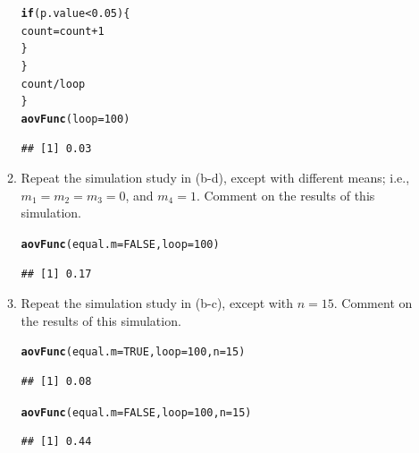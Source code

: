\documentclass{article}\usepackage[]{graphicx}\usepackage[]{color}
\makeatletter
\newcommand{\hlnum}[1]{\textcolor[rgb]{0.686,0.059,0.569}{#1}}%
\newcommand{\hlopt}[1]{\textcolor[rgb]{0,0,0}{#1}}%
\newcommand{\hlstd}[1]{\textcolor[rgb]{0.345,0.345,0.345}{#1}}%
\newcommand{\hlkwa}[1]{\textcolor[rgb]{0.161,0.373,0.58}{\textbf{#1}}}%
\newcommand{\hlkwb}[1]{\textcolor[rgb]{0.69,0.353,0.396}{#1}}%
\newcommand{\hlkwc}[1]{\textcolor[rgb]{0.333,0.667,0.333}{#1}}%
\newcommand{\hlkwd}[1]{\textcolor[rgb]{0.737,0.353,0.396}{\textbf{#1}}}%
\newenvironment{kframe}{%
 \def\at@end@of@kframe{}%
 \ifinner\ifhmode%
  \def\at@end@of@kframe{\end{minipage}}%
  \begin{minipage}{\columnwidth}%
 \fi\fi%
 \def\FrameCommand##1{\hskip\@totalleftmargin \hskip-\fboxsep
 \colorbox{shadecolor}{##1}\hskip-\fboxsep
     \hskip-\linewidth \hskip-\@totalleftmargin \hskip\columnwidth}%
 \MakeFramed {\advance\hsize-\width
   \@totalleftmargin\z@ \linewidth\hsize
   \@setminipage}}%
 {\par\unskip\endMakeFramed%
 \at@end@of@kframe}
\newenvironment{knitrout}{}{} %
\makeatother
\begin{document}
\begin{enumerate}
\begin{enumerate}
\begin{knitrout}
\begin{kframe}
\begin{alltt}
    \hlkwa{if}\hlstd{(p.value}\hlopt{<}\hlnum{0.05}\hlstd{)\{}
     \hlstd{count}\hlkwb{=}\hlstd{count}\hlopt{+}\hlnum{1}
    \hlstd{\}}
  \hlstd{\}}
  \hlstd{count}\hlopt{/}\hlstd{loop}
\hlstd{\}}
\hlkwd{aovFunc}\hlstd{(}\hlkwc{loop}\hlstd{=}\hlnum{100}\hlstd{)}
\end{alltt}
\begin{verbatim}
## [1] 0.03
\end{verbatim}
\end{kframe}
\end{knitrout}

  \item Repeat the simulation study in (b-d), except with different means; i.e.,
  $m_1=m_2=m_3=0$, and $m_4=1$. Comment on the results of this simulation.

\begin{knitrout}
\color{fgcolor}\begin{kframe}
\begin{alltt}
\hlkwd{aovFunc}\hlstd{(}\hlkwc{equal.m}\hlstd{=}\hlnum{FALSE}\hlstd{,} \hlkwc{loop}\hlstd{=}\hlnum{100}\hlstd{)}
\end{alltt}
\begin{verbatim}
## [1] 0.17
\end{verbatim}
\end{kframe}
\end{knitrout}
\item Repeat the simulation study in (b-c), except with $n=15$. Comment on the results of this simulation.
\begin{knitrout}
\color{fgcolor}\begin{kframe}
\begin{alltt}
\hlkwd{aovFunc}\hlstd{(}\hlkwc{equal.m}\hlstd{=}\hlnum{TRUE}\hlstd{,} \hlkwc{loop}\hlstd{=}\hlnum{100}\hlstd{,} \hlkwc{n}\hlstd{=}\hlnum{15}\hlstd{)}
\end{alltt}
\begin{verbatim}
## [1] 0.08
\end{verbatim}
\begin{alltt}
\hlkwd{aovFunc}\hlstd{(}\hlkwc{equal.m}\hlstd{=}\hlnum{FALSE}\hlstd{,} \hlkwc{loop}\hlstd{=}\hlnum{100}\hlstd{,} \hlkwc{n}\hlstd{=}\hlnum{15}\hlstd{)}
\end{alltt}
\begin{verbatim}
## [1] 0.44
\end{verbatim}
\end{kframe}
\end{knitrout}

\end{enumerate}
\end{enumerate}
\end{document}
